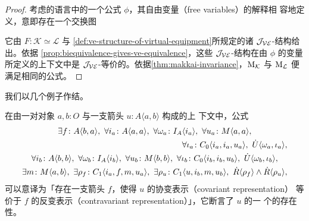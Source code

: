 \begin{proof}
考虑\trVirtualEquipment{}的语言中的一个公式 $\phi$，其自由变量（free variables）的解释相
容地定义，意即存在一个交换图
\begin{center}
\end{center}
它由\trCosmologicalBiequivalence{} $F\colon\mathcal{K}\simeq\mathcal{L}$ 与
\cref{def:ve-structure-of-virtual-equipment}所规定的诸 $\mathcal{J}_{\mathcal{VE}}$-结构给出。依据%
\cref{prop:biequivalence-gives-ve-equivalence}，这些 $\mathcal{J}_{\mathcal{VE}}$-结构在由 $\phi$
的变量所定义的上下文中是 $\mathcal{J}_{\mathcal{VE}}$-等价的。依据\cref{thm:makkai-invariance}，$\mathrm{M}_{\mathcal{K}}$
与 $\mathrm{M}_{\mathcal{L}}$ 便满足相同的公式。
\end{proof}

我们以几个例子作结。

\begin{example}\label{exa:left-adjoint-formula}
在由一对对象 $a,b\colon O$ 与一支箭头 $u\colon A\langle a,b\rangle$ 构成的上
下文中，公式
\begin{equation*}
\begin{gathered}
\exists f\colon A\langle b,a\rangle,\ \forall i_{a}\colon A\langle a,a\rangle,\ \forall\omega_{a}\colon I_{A}\langle i_{a}\rangle,\ \forall u_{a}\colon M\langle a,a\rangle,\\
\hfill \forall\iota_{a}\colon C_{0}\langle i_{a},i_{a},u_{a}\rangle,\ \dot{U}\langle\omega_{a},\iota_{a}\rangle,\\
\forall i_{b}\colon A\langle b,b\rangle,\ \forall\omega_{b}\colon I_{A}\langle i_{b}\rangle,\ \forall u_{b}\colon M\langle b,b\rangle,\ \forall\iota_{b}\colon C_{0}\langle i_{b},i_{b},u_{b}\rangle,\ \dot{U}\langle\omega_{b},\iota_{b}\rangle,\\
\exists m\colon M\langle a,b\rangle,\ \exists\rho_{f}\colon C_{1}\langle i_{a},f,m,u_{a}\rangle,\ \exists\rho_{u}\colon C_{1}\langle u,i_{b},m,u_{b}\rangle,\ \dot{R}\langle\rho_{f}\rangle\wedge\dot{R}\langle\rho_{u}\rangle,
\end{gathered}
\end{equation*}
可以意译为「存在一支箭头 $f$，使得 $u$ 的协变表示（covariant representation）
等价于 $f$ 的反变表示（contravariant representation）」，它断言了 $u$ 的一
个\trLeftAdjoint{}的存在性。
\end{example}

